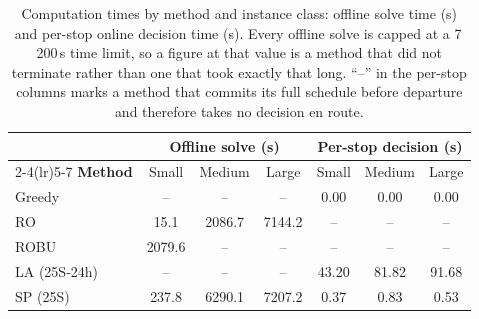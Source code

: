 \begin{table}[htbp]
\centering
\caption{Computation times by method and instance class: offline solve time (s) and per-stop online decision time (s).  Every offline solve is capped at a 7\,200\,s time limit, so a figure at that value is a method that did not terminate rather than one that took exactly that long.  ``--'' in the per-stop columns marks a method that commits its full schedule before departure and therefore takes no decision en route.}
\label{tab:runtime}
\begin{tabular}{lcccccc}
\toprule
& \multicolumn{3}{c}{\textbf{Offline solve (s)}} & \multicolumn{3}{c}{\textbf{Per-stop decision (s)}}\\
\cmidrule(lr){2-4}\cmidrule(lr){5-7}
\textbf{Method} & Small & Medium & Large & Small & Medium & Large\\
\midrule
Greedy & -- & -- & -- & 0.00 & 0.00 & 0.00 \\
RO & 15.1 & 2086.7 & 7144.2 & -- & -- & -- \\
ROBU & 2079.6 & -- & -- & -- & -- & -- \\
LA (25S-24h) & -- & -- & -- & 43.20 & 81.82 & 91.68 \\
SP (25S) & 237.8 & 6290.1 & 7207.2 & 0.37 & 0.83 & 0.53 \\
\bottomrule
\end{tabular}
\end{table}
